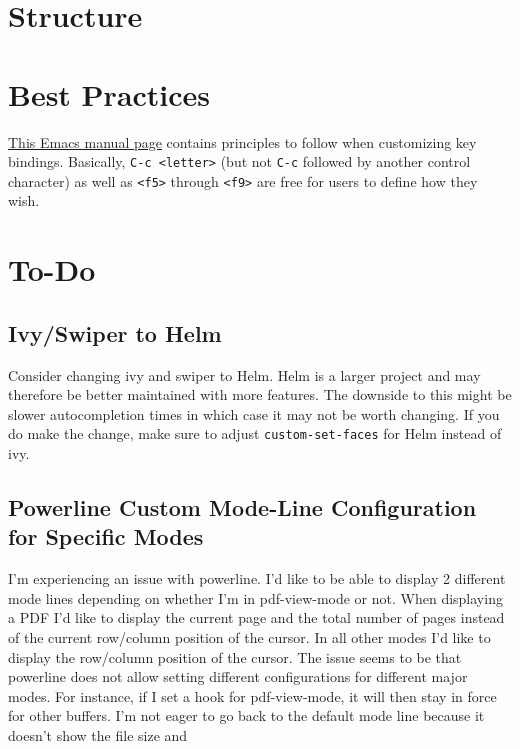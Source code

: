\documentclass{default}
\begin{document}
\chapter{Structure}\label{cha:structure}


\chapter{Best Practices}
\label{cha:best-practices}

\href{https://www.gnu.org/software/emacs/manual/html_node/elisp/Key-Binding-Conventions.html}{This
  Emacs manual page} contains principles to follow when customizing key bindings. Basically,
\texttt{C-c <letter>} (but not \texttt{C-c} followed by another control
character) as well as \texttt{<f5>} through \texttt{<f9>} are free for users to
define how they wish.


\chapter{To-Do}\label{cha:to-do}

\section{Ivy/Swiper to Helm}\label{sec:ivyswiper-helm}

Consider changing ivy and swiper to Helm. Helm is a larger project and may therefore be better
maintained with more features. The downside to this might be slower autocompletion times in which
case it may not be worth changing. If you do make the change, make sure to adjust
\lstinline{custom-set-faces} for Helm instead of ivy.


\section{Powerline Custom Mode-Line Configuration for Specific Modes}
\label{sec:powerl-cust-mode}

I'm experiencing an issue with powerline. I'd like to be able to display 2 different mode lines
depending on whether I'm in pdf-view-mode or not. When displaying a PDF I'd like to display the
current page and the total number of pages instead of the current row/column position of the
cursor. In all other modes I'd like to display the row/column position of the cursor. The issue
seems to be that powerline does not allow setting different configurations for different major
modes. For instance, if I set a hook for pdf-view-mode, it will then stay in force for other
buffers. I'm not eager to go back to the default mode line because it doesn't show the file size and
\end{document}
